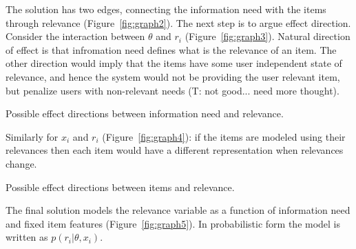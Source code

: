 \documentclass[10pt]{tufte-handout}
\begin{document}
The solution has two edges, connecting the information need with the items through
relevance (Figure~\ref{fig:graph2}). The next step is to argue effect direction. Consider the interaction between $\theta$ and $r_i$ (Figure~\ref{fig:graph3}). Natural direction of effect is that infromation need defines what is the relevance of an item. The other direction would imply that the items have some user independent state of relevance, and hence the system would not be providing the user relevant item, but penalize users with non-relevant needs (T: not good... need more thought).

\begin{marginfigure}%

\noindent{}
\caption{Possible effect directions between information need and
  relevance.}
\label{fig:graph3}
\end{marginfigure}

Similarly for $x_i$ and $r_i$ (Figure~\ref{fig:graph4}): if the items are modeled using their relevances then each item would have a different representation when relevances change.

\begin{marginfigure}%

\noindent{}
\caption{Possible effect directions between items and
  relevance.}
\label{fig:graph4}
\end{marginfigure}

The final solution models the relevance variable as a function of information need and fixed item features (Figure~\ref{fig:graph5}). In probabilistic form the model is written as $p(r_i|\theta, x_i)$.
\end{document}
